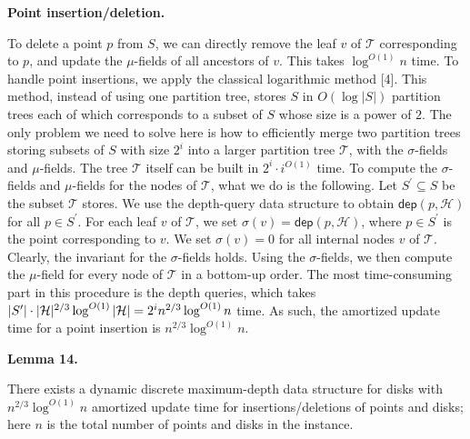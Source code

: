 \documentclass[10pt,a4paper]{article}
\begin{document}
\par
\par
\par\medskip\noindent\textbf{Point insertion/deletion.}\par
To delete a point $p$ from $S$, we can directly remove the leaf $v$ of $\mathcal{T}$ corresponding to $p$, and update the $\mu$-fields of all ancestors of $v$. This takes $\log^{O(1)}n$ time. To handle point insertions, we apply the classical logarithmic method [4]. This method, instead of using one partition tree, stores $S$ in $O(\log|S|)$ partition trees each of which corresponds to a subset of $S$ whose size is a power of $2$. The only problem we need to solve here is how to efficiently merge two partition trees storing subsets of $S$ with size $2^{i}$ into a larger partition tree $\mathcal{T}$, with the $\sigma$-fields and $\mu$-fields. The tree $\mathcal{T}$ itself can be built in $2^{i}\cdot i^{O(1)}$ time. To compute the $\sigma$-fields and $\mu$-fields for the nodes of $\mathcal{T}$, what we do is the following. Let $S^{\prime}\subseteq S$ be the subset $\mathcal{T}$ stores. We use the depth-query data structure to obtain $\mathsf{dep}(p,\mathcal{H})$ for all $p\in S^{\prime}$. For each leaf $v$ of $\mathcal{T}$, we set $\sigma(v)=\mathsf{dep}(p,\mathcal{H})$, where $p\in S^{\prime}$ is the point corresponding to $v$. We set $\sigma(v)=0$ for all internal nodes $v$ of $\mathcal{T}$. Clearly, the invariant for the $\sigma$-fields holds. Using the $\sigma$-fields, we then compute the $\mu$-field for every node of $\mathcal{T}$ in a bottom-up order. The most time-consuming part in this procedure is the depth queries, which takes $|S^{\prime}|\cdot|\mathcal{H}|^{2/3}\log^{O(1)}|\mathcal{H}|=2^{i}n^{2/3}\log^%
{O(1)}n$ time. As such, the amortized update time for a point insertion is $n^{2/3}\log^{O(1)}n$.
\par
\par
\par\medskip\noindent\textbf{Lemma 14.}\par
There exists a dynamic discrete maximum-depth data structure for disks with $n^{2/3}\log^{O(1)}n$ amortized update time for insertions/deletions of points and disks; here $n$ is the total number of points and disks in the instance.
\par
\par
\par
\end{document}
